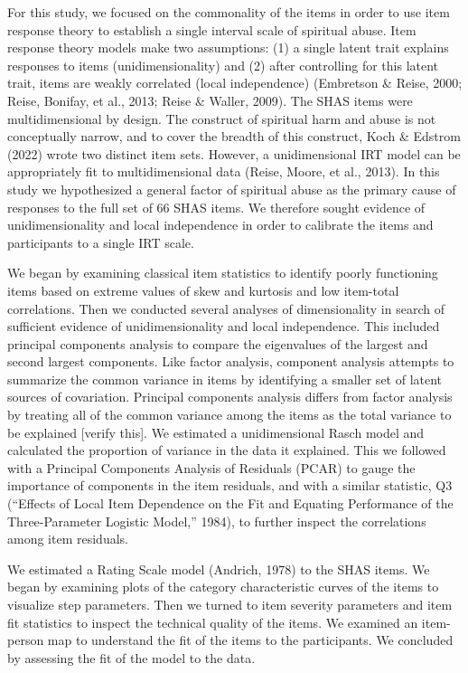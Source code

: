 \documentclass[
  letterpaper,
]{article}
\begin{document}
For this study, we focused on the commonality of the items in order to
use item response theory to establish a single interval scale of
spiritual abuse. Item response theory models make two assumptions: (1) a
single latent trait explains responses to items (unidimensionality) and
(2) after controlling for this latent trait, items are weakly correlated
(local independence) (Embretson \& Reise, 2000; Reise, Bonifay, et al.,
2013; Reise \& Waller, 2009). The SHAS items were multidimensional by
design. The construct of spiritual harm and abuse is not conceptually
narrow, and to cover the breadth of this construct, Koch \& Edstrom
(2022) wrote two distinct item sets. However, a unidimensional IRT model
can be appropriately fit to multidimensional data (Reise, Moore, et al.,
2013). In this study we hypothesized a general factor of spiritual abuse
as the primary cause of responses to the full set of 66 SHAS items. We
therefore sought evidence of unidimensionality and local independence in
order to calibrate the items and participants to a single IRT scale.

We began by examining classical item statistics to identify poorly
functioning items based on extreme values of skew and kurtosis and low
item-total correlations. Then we conducted several analyses of
dimensionality in search of sufficient evidence of unidimensionality and
local independence. This included principal components analysis to
compare the eigenvalues of the largest and second largest components.
Like factor analysis, component analysis attempts to summarize the
common variance in items by identifying a smaller set of latent sources
of covariation. Principal components analysis differs from factor
analysis by treating all of the common variance among the items as the
total variance to be explained {[}verify this{]}. We estimated a
unidimensional Rasch model and calculated the proportion of variance in
the data it explained. This we followed with a Principal Components
Analysis of Residuals (PCAR) to gauge the importance of components in
the item residuals, and with a similar statistic, Q3 ({``Effects of
Local Item Dependence on the Fit and Equating Performance of the
Three-Parameter Logistic Model,''} 1984), to further inspect the
correlations among item residuals.

We estimated a Rating Scale model (Andrich, 1978) to the SHAS items. We
began by examining plots of the category characteristic curves of the
items to visualize step parameters. Then we turned to item severity
parameters and item fit statistics to inspect the technical quality of
the items. We examined an item-person map to understand the fit of the
items to the participants. We concluded by assessing the fit of the
model to the data.
\end{document}
